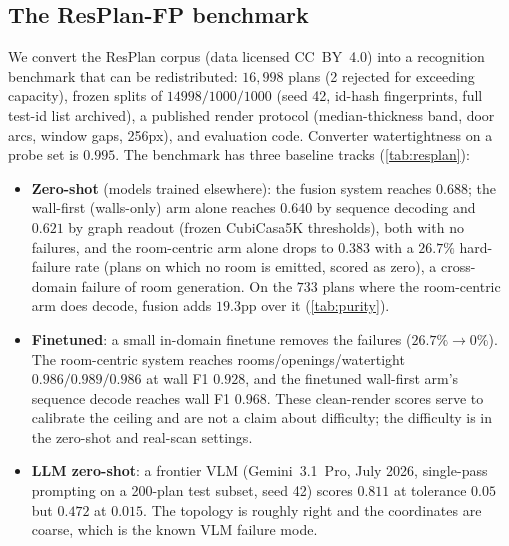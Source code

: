 \documentclass{article}
\begin{document}
\subsection{The ResPlan-FP benchmark}\label{sec:resplan}
We convert the ResPlan corpus (data licensed
CC~BY~4.0) into a recognition benchmark that can be redistributed: $16{,}998$
plans (2 rejected for exceeding capacity), frozen splits of $14998/1000/1000$
(seed 42, id-hash fingerprints, full test-id list archived), a published render
protocol (median-thickness band, door arcs, window gaps, 256px), and evaluation
code. Converter watertightness on a probe set is $0.995$. The benchmark has
three baseline tracks (\cref{tab:resplan}):
\begin{itemize}
\item \textbf{Zero-shot} (models trained elsewhere): the fusion system reaches
  $0.688$; the wall-first (walls-only) arm alone reaches $0.640$ by sequence
  decoding and $0.621$ by graph readout (frozen CubiCasa5K thresholds), both with no
  failures, and the room-centric arm alone drops to $0.383$ with a $26.7\%$
  hard-failure rate (plans on which no room is emitted, scored as zero), a
  cross-domain failure of room generation. On the $733$ plans where the
  room-centric arm does decode, fusion adds $19.3$pp over it
  (\cref{tab:purity}).
\item \textbf{Finetuned}: a small in-domain finetune removes the failures
  ($26.7\%\to0\%$). The room-centric system reaches rooms/openings/watertight
  $0.986/0.989/0.986$ at wall F1 $0.928$, and the finetuned wall-first arm's
  sequence decode reaches wall F1 $0.968$. These clean-render scores serve to
  calibrate the ceiling and are not a claim about difficulty; the difficulty is
  in the zero-shot and real-scan settings.
\item \textbf{LLM zero-shot}: a frontier VLM (Gemini~3.1~Pro, July 2026,
  single-pass prompting on a 200-plan test subset, seed 42) scores $0.811$ at
  tolerance $0.05$ but $0.472$ at $0.015$. The topology is roughly right and
  the coordinates are coarse, which is the known VLM failure mode.
\end{itemize}
\end{document}
